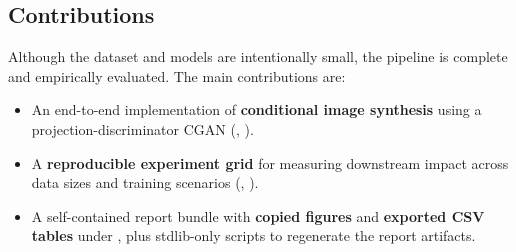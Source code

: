 \subsection{Contributions}

Although the dataset and models are intentionally small, the pipeline is complete and empirically evaluated. The main contributions are:
\begin{itemize}
\item An end-to-end implementation of \textbf{conditional image synthesis} using a projection-discriminator CGAN (, ).
\item A \textbf{reproducible experiment grid} for measuring downstream impact across data sizes and training scenarios (, ).
\item A self-contained report bundle with \textbf{copied figures} and \textbf{exported CSV tables} under , plus stdlib-only scripts to regenerate the report artifacts.
\end{itemize}
